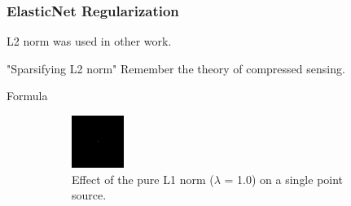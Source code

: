\subsubsection{ElasticNet Regularization} \label{dist:deconv:reg}
L2 norm was used in other work. \cite{ferrari2014distributed}

"Sparsifying L2 norm"
Remember the theory of compressed sensing.

Formula

\begin{figure}[h]
	\centering
	\begin{subfigure}[b]{0.3\linewidth}
		\includegraphics[width=\linewidth]{./chapters/03.distribution/L1.png}
		\caption{Effect of the pure L1 norm ($\lambda$ = 1.0) on a single point source.}
		\label{dist:cd:elastic:L1}
	\end{subfigure}
	\begin{subfigure}[b]{0.3\linewidth}

\end{subfigure}
\end{figure}
